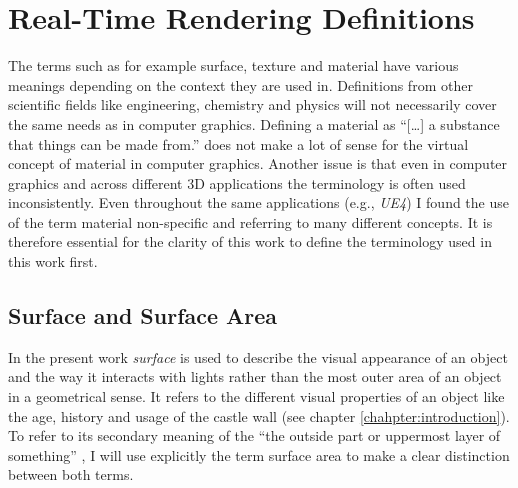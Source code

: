 \chapter{Real-Time Rendering Definitions}\label{cha:definitions}

The terms such as for example surface, texture and material have various meanings depending on the context they are used in. Definitions from other scientific fields like engineering, chemistry and physics will not necessarily cover the same needs as in computer graphics. Defining a material as ``[\ldots] a substance that things can be made from.'' \cite{oxford2018dictionary} does not make a lot of sense for the virtual concept of material in computer graphics. Another issue is that even in computer graphics and across different 3D applications the terminology is often used inconsistently. Even throughout the same applications (e.g., \emph{UE4}) I found the use of the term material non-specific and referring to many different concepts. It is therefore essential for the clarity of this work to define the terminology used in this work first.


\section{Surface and Surface Area}\label{sec:surface}

In the present work \emph{surface} is used to describe the visual appearance of an object and the way it interacts with lights rather than the most outer area of an object in a geometrical sense. It refers to the different visual properties of an object like the age, history and usage of the castle wall (see chapter \ref{chahpter:introduction}).
To refer to its secondary meaning of the ``the outside part or uppermost layer of something'' \cite{oxford2018dictionary}, I will use explicitly the term surface area to make a clear distinction between both terms.


